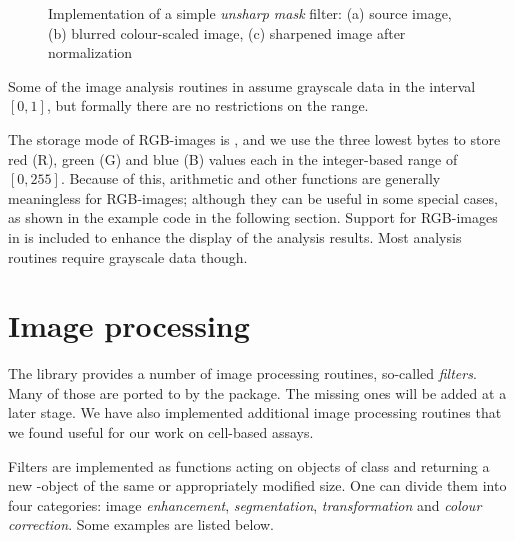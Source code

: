 \begin{figure}
\vspace*{.1in}
\begin{center}
\end{center}
\caption{\label{figure:sharpening}
    Implementation of a simple {\em unsharp mask} filter: (a) source image, (b) blurred colour-scaled image, (c) sharpened image after normalization}
\end{figure}

Some of the image analysis routines in  assume grayscale data in the interval $[0,1]$, but formally there are no restrictions on the range.

The storage mode of RGB-images is , and we use the three lowest bytes to store red (R), green (G) and blue (B) values each in the integer-based range of $[0, 255]$. Because of this, arithmetic and other functions are generally meaningless for RGB-images; although they can be useful in some special cases, as shown in the example code in the following section. Support for RGB-images in  is included to enhance the display of the analysis results. Most analysis routines require grayscale data though.

\section*{Image processing}

The  library provides a number of image processing routines, so-called {\em filters}. Many of those are ported to \R{} by the package. The missing ones will be added at a later stage. We have also implemented additional image processing routines that we found useful for our work on cell-based assays.

Filters are implemented as functions acting on objects of class  and returning a new -object of the same or appropriately modified size. One can divide them into four categories: image {\em enhancement}, {\em segmentation}, {\em transformation} and {\em colour correction}. Some examples are listed below. 

